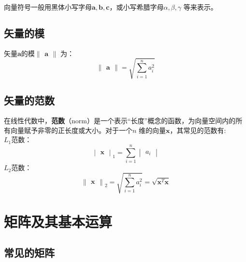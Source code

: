 \documentclass[11pt,fleqn, UTF8]{ctexbook} %
\begin{document}
向量符号一般用黑体小写字母$\boldsymbol{a}, \boldsymbol{b}, \boldsymbol{c}$，或小写希腊字母$\alpha, \beta, \gamma$ 等来表示。

\subsection{矢量的模}

矢量$\boldsymbol{a}$的模$\begin{Vmatrix}\boldsymbol{a}\end{Vmatrix}$ 为：
\begin{equation}\label{2.3}
  \begin{Vmatrix}\boldsymbol{a}\end{Vmatrix}=\sqrt{\sum_{i=1}^{n}a_{i}^{2}}
\end{equation}

\subsection{矢量的范数}
在线性代数中，\textbf{范数}（norm）是一个表示“长度”概念的函数，为向量空间内的所有向量赋予非零的正长度或大小。对于一个$n$ 维的向量$\boldsymbol{x}$，其常见的范数有:\\
$L_1$范数：
    \begin{equation}\label{2.4}
        \begin{vmatrix}\boldsymbol{x}\end{vmatrix}_1=\sum_{i=1}^{n}\begin{vmatrix}a_{i}\end{vmatrix}
    \end{equation}
$L_2$范数：
    \begin{equation}\label{2.5}
        \begin{Vmatrix}\boldsymbol{x}\end{Vmatrix}_2=\sqrt{\sum_{i=1}^{n}a_{i}^{2}}=\sqrt{\boldsymbol{x}^T\boldsymbol{x}}
    \end{equation}


\section{矩阵及其基本运算}

\subsection{常见的矩阵}
\end{document}
